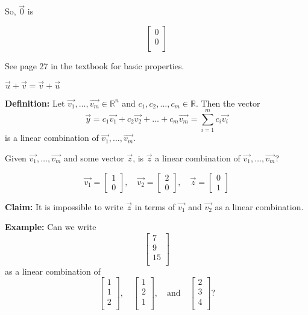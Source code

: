 \documentclass{article}
\begin{document}
So, \(\vec{0}\) is

\[
\begin{bmatrix}
    0 \\
    0 \\
\end{bmatrix}
\]

See page 27 in the textbook for basic properties.

\(\vec{u} + \vec{v} = \vec{v} + \vec{u}\)


\textbf{Definition:} Let \(\vec{v_1}, \ldots, \vec{v_m} \in \mathbb{R}^n\) and \(c_1, c_2, \ldots, c_m \in \mathbb{R}\). Then the vector
\[
\vec{y} = c_1\vec{v_1} + c_2\vec{v_2} + \ldots + c_m\vec{v_m} = \sum_{i=1}^{m} c_i\vec{v_i}
\]
is a linear combination of \(\vec{v_1}, \ldots, \vec{v_m}\).

Given \(\vec{v_1}, \ldots, \vec{v_m}\) and some vector \(\vec{z}\), is \(\vec{z}\) a linear combination of \(\vec{v_1}, \ldots, \vec{v_m}\)?

\[
\vec{v_1} = \begin{bmatrix} 1 \\ 0 \end{bmatrix}, \quad \vec{v_2} = \begin{bmatrix} 2 \\ 0 \end{bmatrix}, \quad \vec{z} = \begin{bmatrix} 0 \\ 1 \end{bmatrix}
\]

\textbf{Claim:} It is impossible to write \(\vec{z}\) in terms of \(\vec{v_1}\) and \(\vec{v_2}\) as a linear combination.

\textbf{Example:} Can we write 
\[
\begin{bmatrix}
    7 \\
    9 \\
    15 \\
\end{bmatrix}
\]
as a linear combination of 
\[
\begin{bmatrix}
    1 \\
    1 \\
    2 \\
\end{bmatrix}, \quad
\begin{bmatrix}
    1 \\
    2 \\
    1 \\
\end{bmatrix}, \quad
\text{and} \quad
\begin{bmatrix}
    2 \\
    3 \\
    4 \\
\end{bmatrix}?
\]
\end{document}
